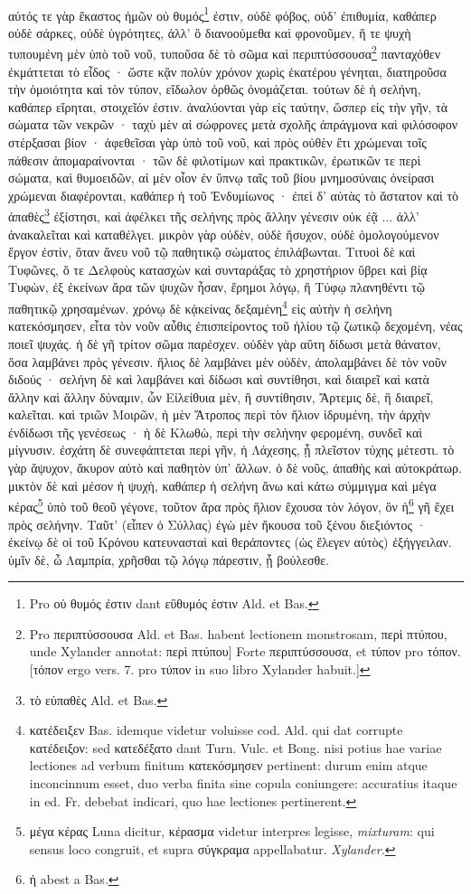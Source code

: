 \documentclass[a4paper, 11pt, oneside, polutonikogreek, german]{article}
\begin{document}
\paragraph{}
αὐτός τε γὰρ ἕκαστος ἡμῶν οὐ θυμός\footnote{Pro οὐ θυμός ἐστιν dant εὒθυμός ἐστιν Ald. et Bas.} ἐστιν, οὐδὲ φόβος, οὐδ' ἐπιθυμία, καθάπερ οὐδὲ σάρκες, οὐδὲ ὑγρότητες, ἀλλ' ὃ διανοούμεθα καὶ φρονοῦμεν, ἥ τε ψυχὴ τυπουμένη μὲν ὑπὸ τοῦ νοῦ, τυποῦσα δὲ τὸ σῶμα καὶ περιπτύσσουσα\footnote{Pro περιπτύσσουσα Ald. et Bas. habent lectionem monstrosam, περὶ πτύπου, unde Xylander annotat: περὶ πτύπου] Forte περιπτύσσουσα, et τύπον pro τόπον. [τόπον ergo vers. 7. pro τύπον in suo libro Xylander habuit.]} πανταχόθεν ἐκμάττεται τὸ εἶδος · ὥστε κᾂν πολὺν χρόνον χωρὶς ἑκατέρου γένηται, διατηροῦσα τὴν ὁμοιότητα καὶ τὸν τύπον, εἴδωλον ὀρθῶς ὀνομάζεται. τούτων δὲ ἡ σελήνη, καθάπερ εἴρηται, στοιχεῖόν ἐστιν. ἀναλύονται γὰρ εἰς ταύτην, ὥσπερ εἰς τὴν γῆν, τὰ σώματα τῶν νεκρῶν · ταχὺ μὲν αἱ σώφρονες μετὰ σχολῆς ἀπράγμονα καὶ φιλόσοφον στέρξασαι βίον · ἀφεθεῖσαι γὰρ ὑπὸ τοῦ νοῦ, καὶ πρὸς οὐθὲν ἔτι χρώμεναι τοῖς πάθεσιν ἀπομαραίνονται · τῶν δὲ φιλοτίμων καὶ πρακτικῶν, ἐρωτικῶν τε περὶ σώματα, καὶ θυμοειδῶν, αἱ μὲν οἷον ἐν ὕπνῳ ταῖς τοῦ βίου μνημοσύναις ὀνείρασι χρώμεναι διαφέρονται, καθάπερ ἡ τοῦ Ἐνδυμίωνος · ἐπεὶ δ' αὐτὰς τὸ ἄστατον καὶ τὸ ἀπαθὲς\footnote{τὸ εὐπαθὲς Ald. et Bas.} ἐξίστησι, καὶ ἀφέλκει τῆς σελήνης πρὸς ἄλλην γένεσιν οὐκ ἐᾷ ... ἀλλ' ἀνακαλεῖται καὶ καταθέλγει. μικρὸν γὰρ οὐδὲν, οὐδὲ ἥσυχον, οὐδὲ ὁμολογούμενον ἔργον ἐστὶν, ὅταν ἄνευ νοῦ τῷ παθητικῷ σώματος ἐπιλάβωνται. Τιτυοὶ δὲ καὶ Τυφῶνες, ὅ τε Δελφοὺς κατασχὼν καὶ συνταράξας τὸ χρηστήριον ὕβρει καὶ βίᾳ Τυφὼν, ἐξ ἐκείνων ἄρα τῶν ψυχῶν ἦσαν, ἔρημοι λόγῳ, ἢ Τύφῳ πλανηθέντι τῷ παθητικῷ χρησαμένων. χρόνῳ δὲ κᾀκείνας δεξαμένη\footnote{κατέδειξεν Bas. idemque videtur voluisse cod. Ald. qui dat corrupte κατέδειξον: sed κατεδέξατο dant Turn. Vulc. et Bong. nisi potius hae variae lectiones ad verbum finitum κατεκόσμησεν pertinent: durum enim atque inconcinnum esset, duo verba finita sine copula coniungere: accuratius itaque in ed. Fr. debebat indicari, quo hae lectiones pertinerent.} εἰς αὐτὴν ἡ σελήνη κατεκόσμησεν, εἶτα τὸν νοῦν αὖθις ἐπισπείροντος τοῦ ἡλίου τῷ ζωτικῷ δεχομένη, νέας ποιεῖ ψυχάς. ἡ δὲ γῆ τρίτον σῶμα παρέσχεν. οὐδὲν γὰρ αὕτη δίδωσι μετὰ θάνατον, ὅσα λαμβάνει πρὸς γένεσιν. ἥλιος δὲ λαμβάνει μὲν οὐδὲν, ἀπολαμβάνει δὲ τὸν νοῦν διδούς · σελήνη δὲ καὶ λαμβάνει καὶ δίδωσι καὶ συντίθησι, καὶ διαιρεῖ καὶ κατὰ ἄλλην καὶ ἄλλην δύναμιν, ὧν Εἰλείθυια μὲν, ἣ συντίθησιν, Ἄρτεμις δὲ, ἣ διαιρεῖ, καλεῖται. καὶ τριῶν Μοιρῶν, ἡ μὲν Ἄτροπος περὶ τὸν ἥλιον ἱδρυμένη, τὴν ἀρχὴν ἐνδίδωσι τῆς γενέσεως · ἡ δὲ Κλωθὼ, περὶ τὴν σελήνην φερομένη, συνδεῖ καὶ μίγνυσιν. ἐσχάτη δὲ συνεφάπτεται περὶ γῆν, ἡ Λάχεσης, ᾗ πλεῖστον τύχης μέτεστι. τὸ γὰρ ἄψυχον, ἄκυρον αὐτὸ καὶ παθητὸν ὑπ' ἄλλων. ὁ δὲ νοῦς, ἀπαθὴς καὶ αὐτοκράτωρ. μικτὸν δὲ καὶ μέσον ἡ ψυχὴ, καθάπερ ἡ σελήνη ἄνω καὶ κάτω σύμμιγμα καὶ μέγα κέρας\footnote{μέγα κέρας Luna dicitur, κέρασμα videtur interpres legisse, \emph{mixturam}: qui sensus loco congruit, et supra σύγκραμα appellabatur. \emph{Xylander.}} ὑπὸ τοῦ θεοῦ γέγονε, τοῦτον ἄρα πρὸς ἥλιον ἔχουσα τὸν λόγον, ὃν ἡ\footnote{ἡ abest a Bas.} γῆ ἔχει πρὸς σελήνην. Ταῦτ' (εἶπεν ὁ Σύλλας) ἐγὼ μὲν ἤκουσα τοῦ ξένου διεξιόντος · ἐκείνῳ δὲ οἱ τοῦ Κρόνου κατευνασταὶ καὶ θεράποντες (ὡς ἔλεγεν αὐτὸς) ἐξήγγειλαν. ὑμῖν δὲ, ὦ Λαμπρία, χρῆσθαι τῷ λόγῳ πάρεστιν, ᾗ βούλεσθε.
\clearpage
\end{document}

